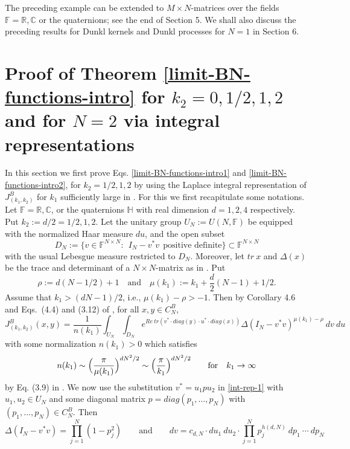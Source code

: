 \documentclass[reqno]{amsart}
\theoremstyle{plain}
\theoremstyle{definition}
\numberwithin{equation}{section}
\begin{document}
The preceding example can be extended to $M\times N$-matrices over the  fields $\mathbb F=\mathbb R, \mathbb C$ or
the quaternions; see the end of Section 5. We shall also discuss the preceding results for  Dunkl kernels and Dunkl processes for $N=1$ in Section 6.


\section{Proof of Theorem \ref {limit-BN-functions-intro} for  $k_2=0,1/2,1,2$ and for $N=2$ via  integral representations}

In this section we first prove  Eqs. \eqref{limit-BN-functions-intro1} and 
\eqref{limit-BN-functions-intro2}, for $k_2=1/2,1,2$ by using the Laplace integral representation of
$J_{(k_1,k_2)}^B$ for $k_1$ sufficiently large in \cite{R4}.
For this  we first recapitulate some notations.
Let $\mathbb F=\mathbb R, \mathbb C$, or the quaternions $\mathbb H$ with real dimension $d=1,2,4$ respectively. Put $k_2:=d/2=1/2,1,2$.
Let the unitary group $U_N:=U(N,\mathbb F)$ be equipped with the normalized Haar measure $du$, and the open subset
$$D_N:=\{ v\in \mathbb F^{N\times N}: \>\> I_N-v^*v \>\>\text{positive definite}\}\subset \mathbb F^{N\times N}$$
with the usual Lebesgue measure restricted to $D_N$. Moreover, let $tr\> x$ and $\Delta(x)$
be the trace and determinant of a $N\times N$-matrix as in \cite{R4}. Put
$$\rho:=d(N-1/2)+1 \quad\text{and}\quad \mu(k_1):=k_1 + \frac{d}{2}(N-1)+1/2.$$
Assume that $k_1> (dN-1)/2$, i.e., $\mu(k_1)-\rho>-1$. Then by Corollary 4.6 and Eqs.~(4.4) and (3.12) of \cite{R4}, for all
$x,y\in C_N^B$,
\begin{equation}\label{int-rep-1}
J_{(k_1,k_2)}^B(x,y)=\frac{1}{n(k_1)}\int_{U_N}\int_{D_N} e^{Re\> tr(v^*\cdot diag(y)\cdot u^*\cdot  diag(x))}
  \Delta(I_N-v^*v)^{\mu(k_1)-\rho}\> dv \> du
\end{equation}
with some normalization   $n(k_1)>0$ which satisfies
\begin{equation}\label{kappa-sim} n(k_1)\sim \Bigl(\frac{\pi}{\mu(k_1)}\Bigr)^{dN^2/2}\sim
  \Bigl(\frac{\pi}{k_1}\Bigr)^{dN^2/2} \quad\quad \text{for}\quad k_1\to\infty
\end{equation}by Eq. (3.9) in \cite{R4}.
We now use the substitution $v^*=u_1pu_2$ in \eqref{int-rep-1}   with $u_1,u_2\in U_N$
and some diagonal matrix $p=diag(p_1,\ldots, p_N)$ with $(p_1,\ldots, p_N)\in C_N^B$. Then
$$\Delta(I_N-v^*v)=\prod_{j=1}^N (1-p_j^2) \quad\quad\text{and}\quad\quad dv=c_{d,N} \cdot du_1 \> du_2 \cdot 
\prod_{j=1}^N p_j^{h(d,N)} \> dp_1 \> \cdots\> dp_N$$
\end{document}
